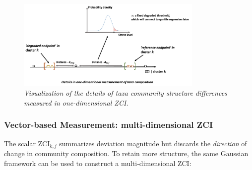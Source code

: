 \begin{figure}[!h]
\centering
\includegraphics[width=0.8\textwidth]{../presentation/figures/p15_details_of_taxa_difference_in_1dimention.png}
\caption{\textit{Visualization of the details of taxa community structure differences measured in one-dimensional ZCI.}}
\label{fig:p15_details_of_taxa_difference_in_1dimention}
\end{figure}

\subsubsection{Vector-based Measurement: multi-dimensional ZCI}
The scalar $\mathrm{ZCI}_{k,j}$ summarizes deviation magnitude but discards the 
\emph{direction} of change in community composition.  
To retain more structure, the same Gaussian framework can be used to construct a 
multi-dimensional ZCI:

